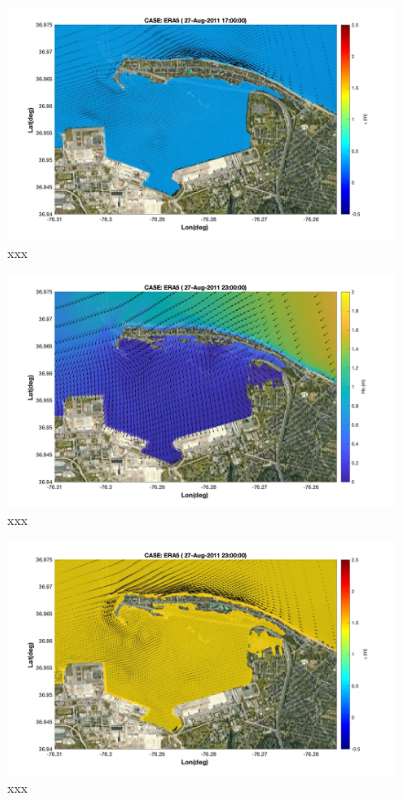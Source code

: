 \documentclass[preprint,12pt,authoryear]{elsarticle}
\begin{document}
\begin{figure}
\centering
\includegraphics[width=\textwidth]{./figures/nearcom_ele_ERA5_55.jpg}
\caption{xxx }
\label{boundary}
\centering
\end{figure}

\begin{figure}
\centering
\includegraphics[width=\textwidth]{./figures/nearcom_hs_ERA5_91.jpg}
\caption{xxx }
\label{boundary}
\centering
\end{figure}

\begin{figure}
\centering
\includegraphics[width=\textwidth]{./figures/nearcom_ele_ERA5_91.jpg}
\caption{xxx }
\label{boundary}
\centering
\end{figure}
\end{document}
